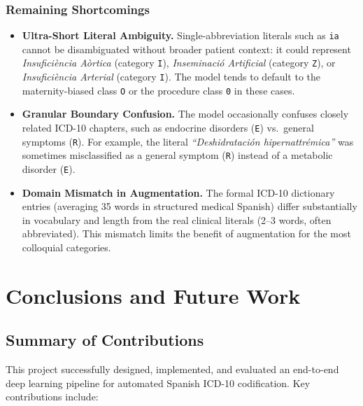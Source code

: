 \documentclass[10pt,a4paper,twocolumn]{article}
\begin{document}
\subsubsection{Remaining Shortcomings}

\begin{itemize}
  \item \textbf{Ultra-Short Literal Ambiguity.} Single-abbreviation literals such
        as \texttt{ia} cannot be disambiguated without broader patient context:
        it could represent \textit{Insufici\`encia A\`ortica} (category \texttt{I}),
        \textit{Inseminaci\'{o} Artificial} (category \texttt{Z}), or
        \textit{Insufici\`encia Arterial} (category \texttt{I}). The model tends
        to default to the maternity-biased class \texttt{O} or the procedure class
        \texttt{0} in these cases.

  \item \textbf{Granular Boundary Confusion.} The model occasionally confuses
        closely related ICD-10 chapters, such as endocrine disorders
        (\texttt{E}) vs.\ general symptoms (\texttt{R}). For example, the
        literal \textit{``Deshidrataci\'{o}n hipernattr\'{e}mica''} was sometimes
        misclassified as a general symptom (\texttt{R}) instead of a metabolic
        disorder (\texttt{E}).

  \item \textbf{Domain Mismatch in Augmentation.} The formal ICD-10 dictionary
        entries (averaging 35 words in structured medical Spanish) differ
        substantially in vocabulary and length from the real clinical literals
        (2--3 words, often abbreviated). This mismatch limits the benefit
        of augmentation for the most colloquial categories.
\end{itemize}

\section{Conclusions and Future Work}
\label{sec:conclusion}

\subsection{Summary of Contributions}

This project successfully designed, implemented, and evaluated an end-to-end
deep learning pipeline for automated Spanish ICD-10 codification. Key
contributions include:
\end{document}
